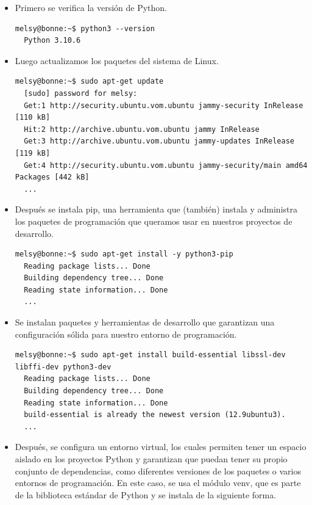 \documentclass{article}
\begin{document}
\begin{itemize}
  \item Primero se verifica la versión de Python.

  \begin{lstlisting}[style=shell]
  melsy@bonne:~$ python3 --version
  Python 3.10.6
  \end{lstlisting}

  \item Luego actualizamos los paquetes del sistema de Linux.

  \begin{lstlisting}[style=shell]
  melsy@bonne:~$ sudo apt-get update
  [sudo] password for melsy:
  Get:1 http://security.ubuntu.vom.ubuntu jammy-security InRelease [110 kB]
  Hit:2 http://archive.ubuntu.vom.ubuntu jammy InRelease
  Get:3 http://archive.ubuntu.vom.ubuntu jammy-updates InRelease [119 kB]
  Get:4 http://security.ubuntu.vom.ubuntu jammy-security/main amd64 Packages [442 kB]
  ...
  \end{lstlisting}
  
  \item Después se instala pip, una herramienta que (también) instala y administra los paquetes de programación que queramos usar en nuestros proyectos de desarrollo.

  \begin{lstlisting}[style=shell]
  melsy@bonne:~$ sudo apt-get install -y python3-pip
  Reading package lists... Done
  Building dependency tree... Done
  Reading state information... Done
  ...
  \end{lstlisting}
  
  \item Se instalan paquetes y herramientas de desarrollo que garantizan una configuración sólida para nuestro entorno de programación.

  \begin{lstlisting}[style=shell]
  melsy@bonne:~$ sudo apt-get install build-essential libssl-dev libffi-dev python3-dev
  Reading package lists... Done
  Building dependency tree... Done
  Reading state information... Done
  build-essential is already the newest version (12.9ubuntu3).
  ...
  \end{lstlisting}
  
  \item Después, se configura un entorno virtual, los cuales permiten tener un espacio aislado en los proyectos Python y garantizan que puedan tener su propio conjunto de dependencias, como diferentes versiones de los paquetes o varios entornos de programación. En este caso, se usa el módulo venv, que es parte de la biblioteca estándar de Python y se instala de la siguiente forma.


\end{itemize}
\end{document}
